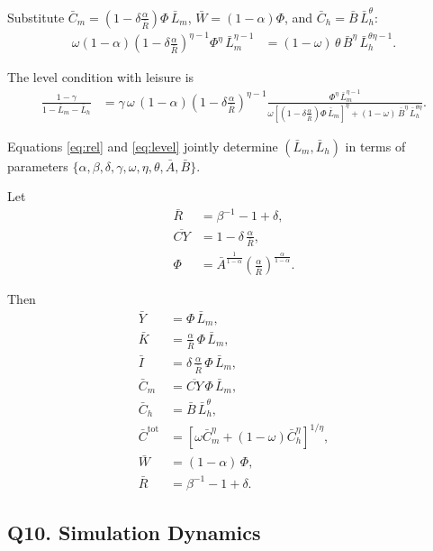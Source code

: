 \documentclass[a4paper,12pt]{article} %
\theoremstyle{nonitalic}
\begin{document}
Substitute $\bar C_m=(1-\delta\frac{\alpha}{\bar R})\Phi\,\bar L_m$, $\bar W=(1-\alpha)\Phi$, and $\bar C_h=\bar B\,\bar L_h^{\theta}$:
\begin{align}
\omega(1-\alpha)\left(1-\delta\frac{\alpha}{\bar R}\right)^{\eta-1}\Phi^{\eta}\,\bar L_m^{\eta-1}
&= (1-\omega)\,\theta\,\bar B^{\eta}\,\bar L_h^{\theta\eta-1}.
\tag{*}\label{eq:rel}
\end{align}

The level condition with leisure is
\begin{align}
\frac{1-\gamma}{1-\bar L_m-\bar L_h}
&= \gamma\,\omega\,(1-\alpha)\left(1-\delta\frac{\alpha}{\bar R}\right)^{\eta-1}
\frac{\Phi^{\eta}\,\bar L_m^{\eta-1}}{
\omega\left[\left(1-\delta\frac{\alpha}{\bar R}\right)\Phi\,\bar L_m\right]^{\eta}
+(1-\omega)\,\bar B^{\eta}\,\bar L_h^{\theta\eta}}.
\tag{**}\label{eq:level}
\end{align}

Equations \eqref{eq:rel} and \eqref{eq:level} jointly determine $(\bar L_m,\bar L_h)$ in terms of parameters
$\{\alpha,\beta,\delta,\gamma,\omega,\eta,\theta,\bar A,\bar B\}$.

Let
\begin{align}
\bar R &= \beta^{-1}-1+\delta, \\
\overline{CY} &= 1-\delta\,\frac{\alpha}{\bar R}, \\
\Phi &= \bar A^{\tfrac{1}{1-\alpha}}
\left(\frac{\alpha}{\bar R}\right)^{\tfrac{\alpha}{1-\alpha}}.
\end{align}

Then
\begin{align}
\bar Y &= \Phi\,\bar L_m, \\
\bar K &= \frac{\alpha}{\bar R}\,\Phi\,\bar L_m, \\
\bar I &= \delta\,\frac{\alpha}{\bar R}\,\Phi\,\bar L_m, \\
\bar C_m &= \overline{CY}\,\Phi\,\bar L_m, \\
\bar C_h &= \bar B\,\bar L_h^{\theta}, \\
\bar C^{\mathrm{tot}} &= \left[\omega \bar C_m^{\eta}+(1-\omega)\bar C_h^{\eta}\right]^{1/\eta}, \\
\bar W &= (1-\alpha)\,\Phi, \\
\bar R &= \beta^{-1}-1+\delta.
\end{align}

\subsection*{Q10. Simulation Dynamics}
\end{document}
